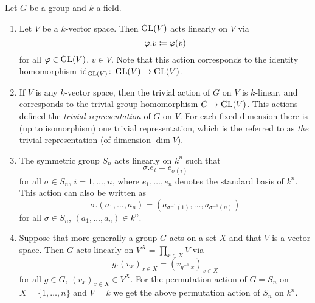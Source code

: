 \begin{example}
  Let $G$ be a group and $k$ a field.
  \begin{enumerate}
    \item
      Let $V$ be a $k$-vector space.
      Then $\operatorname{GL}(V)$ acts linearly on $V$ via
      \[
                  \varphi.v
        \coloneqq  \varphi(v)
      \]
      for all $\varphi \in \operatorname{GL}(V)$, $v \in V$.
      Note that this action corresponds to the identity homomorphism $\operatorname{id}_{\operatorname{GL}(V)} \colon \operatorname{GL}(V) \to \operatorname{GL}(V)$.
    \item
      If $V$ is any $k$-vector space, then the trivial action of $G$ on $V$ is $k$-linear, and corresponds to the trivial group homomorphism $G \to \operatorname{GL}(V)$.
      This actions defined the \emph{trivial representation} of $G$ on $V$.
      For each fixed dimension there is (up to isomorphism) one trivial representation, which is the referred to as \emph{the} trivial representation (of dimension $\dim V$).
    \item
      The symmetric group $S_n$ acts linearly on $k^n$ such that
      \[
        \sigma.e_i = e_{\sigma(i)}
      \]
      for all $\sigma \in S_n$, $i = 1, \dotsc, n$, where $e_1, \dotsc, e_n$ denotes the standard basis of $k^n$.
      This action can also be written as
      \[
          \sigma.(a_1, \dotsc, a_n)
        = ( a_{\sigma^{-1}(1)}, \dotsc, a_{\sigma^{-1}(n)} )
      \]
      for all $\sigma \in S_n$, $(a_1, \dotsc, a_n) \in k^n$.
    \item
      Suppose that more generally a group $G$ acts on a set $X$ and that $V$ is a vector space.
      Then $G$ acts linearly on $V^X = \prod_{x \in X} V$ via
      \[
          g.(v_x)_{x \in X}
        = (v_{g^{-1}.x})_{x \in X}
      \]
      for all $g \in G$, $(v_x)_{x \in X} \in V^X$.
      For the permutation action of $G = S_n$ on $X = \{1, \dotsc, n\}$ and $V = k$ we get the above permutation action of $S_n$ on $k^n$.
      

\end{enumerate}
\end{example}
